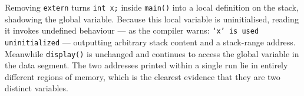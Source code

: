 
Removing \texttt{extern} turns \texttt{int x;} inside \texttt{main()} into a
local definition on the stack, shadowing the global variable. Because this local
variable is uninitialised, reading it invokes undefined behaviour --- as the
compiler warns: \texttt{`x' is used uninitialized} --- outputting arbitrary
stack content and a stack-range address. Meanwhile \texttt{display()} is
unchanged and continues to access the global variable in the data segment. The
two addresses printed within a single run lie in entirely different regions of
memory, which is the clearest evidence that they are two distinct variables.
